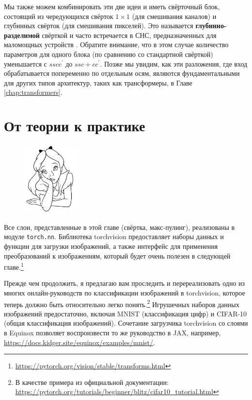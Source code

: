 Мы также можем комбинировать эти две идеи и иметь свёрточный блок, состоящий из чередующихся свёрток $1 \times 1$ (для смешивания каналов) и глубинных свёрток (для смешивания пикселей). Это называется \textbf{глубинно-разделимой} свёрткой и часто встречается в СНС, предназначенных для маломощных устройств \cite{howard2017mobilenets}. Обратите внимание, что в этом случае количество параметров для одного блока (по сравнению со стандартной свёрткой) уменьшается с $sscc^\prime$ до $ssc + cc^\prime$. Позже мы увидим, как эти разложения, где вход обрабатывается попеременно по отдельным осям, являются фундаментальными для других типов архитектур, таких как трансформеры, в Главе \ref{chap:transformers}.

\section*{От теории к практике}

\begin{figure}
\vspace{-3em}\includegraphics[width=3.0cm]{images/shutterstock_2075221579.jpg}
\vspace{-2em}
\end{figure}

Все слои, представленные в этой главе (свёртка, макс-пулинг), реализованы в модуле \texttt{torch.nn}. Библиотека torchvision предоставляет наборы данных и функции для загрузки изображений, а также интерфейс для применения преобразований к изображениям, который будет очень полезен в следующей главе.\footnote{\url{https://pytorch.org/vision/stable/transforms.html}} 

Прежде чем продолжить, я предлагаю вам проследить и перереализовать одно из многих онлайн-руководств по классификации изображений в torchvision, которое теперь должно быть относительно легко понять.\footnote{В качестве примера из официальной документации: \url{https://pytorch.org/tutorials/beginner/blitz/cifar10_tutorial.html}} Игрушечных наборов данных изображений предостаточно, включая MNIST (классификация цифр) и CIFAR-10 (общая классификация изображений). Сочетание загрузчика torchvision со слоями в Equinox позволяет воспроизвести то же руководство в JAX, например, \url{https://docs.kidger.site/equinox/examples/mnist/}.

